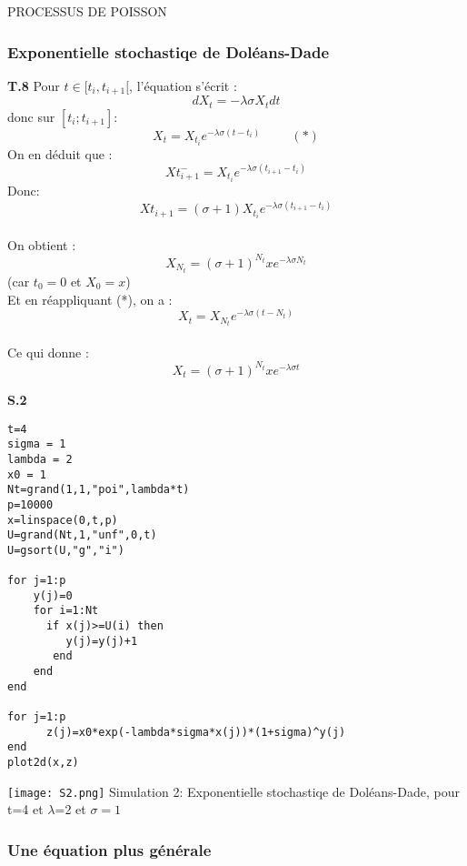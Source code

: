 PROCESSUS DE POISSON\documentclass[a4paper,10pt]{article}
\begin{document}
 \subsubsection[Exponentielle stochastiqe]{Exponentielle stochastiqe de Doléans-Dade}
\textbf{T.8}  Pour $t \in [t_i,t_{i+1}[$, l'\'equation s'\'ecrit : 
 $$dX_t=-\lambda \sigma X_t dt$$ donc sur $[t_i; t_{i+1}]$:
 $$X_t=X_{t_i} e^{-\lambda \sigma (t-t_i)} \hspace{1cm} (*)$$ On en d\'eduit que : $$X{t_{i+1}^-}=X_{t_i}e^{-\lambda \sigma (t_{i+1}-t_i)}$$ Donc:\\
 $$X{t_{i+1}}=(\sigma + 1) X_{t_i}e^{-\lambda \sigma (t_{i+1}-t_i)}$$
 \\On obtient : 
 $$X_{N_t}= (\sigma + 1)^{N_t} x e^{-\lambda \sigma N_t}$$ (car $t_0=0$ et $X_0=x$)\\
 Et en r\'eappliquant (*), on a : 
 $$X_t=X_{N_t} e^{-\lambda \sigma (t-N_t)}$$ \\
 Ce qui donne : 
 $$X_t=(\sigma + 1)^{N_t} x e^{-\lambda \sigma t}$$
 
 
\textbf{S.2}
\begin{lstlisting}
t=4
sigma = 1
lambda = 2
x0 = 1
Nt=grand(1,1,"poi",lambda*t)
p=10000
x=linspace(0,t,p)
U=grand(Nt,1,"unf",0,t)
U=gsort(U,"g","i")

for j=1:p
    y(j)=0
    for i=1:Nt
      if x(j)>=U(i) then 
         y(j)=y(j)+1
       end
    end
end
   
for j=1:p
      z(j)=x0*exp(-lambda*sigma*x(j))*(1+sigma)^y(j)
end
plot2d(x,z)
\end{lstlisting}

\begin{center}
\texttt{[image: S2.png]}
Simulation 2: Exponentielle stochastiqe de Doléans-Dade, pour t=4 et $\lambda$=2 et $\sigma=1$
\end{center}

 \subsubsection[Une équation plus générale]{Une équation plus générale}
\end{document}
